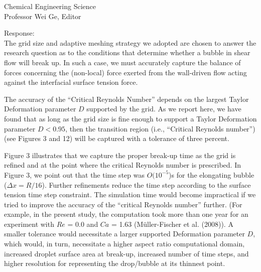 \documentclass{letter}
\begin{document}
\begin{letter}{
Chemical Engineering Science\\
Professor Wei Ge, Editor\\}
\begin{enumerate}
Response: \\
The grid size and adaptive meshing strategy we adopted are chosen to answer the research question as to the conditions that determine 
whether a bubble in shear flow will break up.  
In such a case, we must accurately capture the balance of forces concerning the (non-local) force exerted from the wall-driven 
flow acting against the interfacial surface tension force.

The accuracy of the ``Critical Reynolds Number'' depends on the largest Taylor Deformation parameter $D$ supported by the grid.  
As we report here, we have found that as long as the grid size is fine enough to support a Taylor Deformation parameter $D<0.95$, 
then the transition region (i.e., ``Critical Reynolds number'') (see Figures 3 and 12) will be captured with a tolerance of three percent. 

Figure 3 illustrates that we capture the proper break-up time as the grid is refined and at the point where the critical Reynolds
number is prescribed. In Figure 3, we point out that the time step was $O(10^{-5}$)s for the elongating bubble ($\Delta x=R/16$).
Further refinements reduce the time step according to the surface tension time step constraint. 
The simulation time would become impractical if we tried to improve the accuracy of the ``critical Reynolds number'' further.  
(For example, in the present study, the computation took more than one year for an experiment with $Re$ = 0.0 and $Ca$ = 1.63 
(M\"{u}ller-Fischer et al. (2008)).
A smaller tolerance would necessitate a larger  supported Deformation parameter $D$, which would, in turn, necessitate a 
higher aspect ratio computational domain, increased droplet surface area at break-up, increased number of time steps, and 
higher resolution for representing the drop/bubble at its thinnest point. \\
\\


\end{enumerate}
\end{letter}
\end{document}
